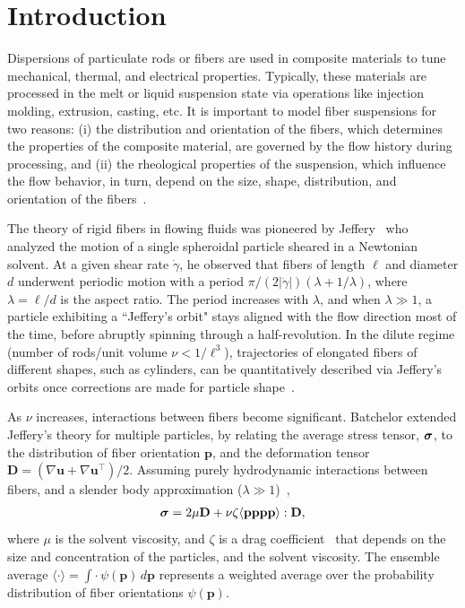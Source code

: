 \documentclass[AMA,STIX1COL]{WileyNJD-v2}
\begin{document}


\section{Introduction}\label{s:intro}
Dispersions of particulate rods or fibers are used in composite
materials to tune mechanical, thermal, and electrical properties.
Typically, these materials are processed in the melt or liquid
suspension state via operations like injection molding, extrusion,
casting, etc. It is important to model fiber suspensions for two
reasons: (i) the distribution and orientation of the fibers, which
determines the properties of the composite material, are governed by the
flow history during processing, and (ii) the rheological properties of
the suspension, which influence the flow behavior, in turn, depend on
the size, shape, distribution, and orientation of the
fibers~\cite{larsoncf}.

The theory of rigid fibers in flowing fluids was pioneered by
Jeffery~\cite{Jeffery1922} who analyzed the motion of a single
spheroidal particle sheared in a Newtonian solvent. At a given shear
rate $\dot{\gamma}$, he observed that fibers of length $\ell$ and
diameter $d$ underwent periodic motion with a period $\pi/(2|\dot{\gamma}|)
(\lambda + 1/\lambda)$, where $\lambda = \ell/d$ is the aspect ratio.
The period increases with $\lambda$, and when $\lambda \gg 1$, a
particle exhibiting a ``Jeffery's orbit" stays aligned with the flow
direction most of the time, before abruptly spinning through a
half-revolution. In the dilute regime (number of rods/unit volume $\nu <
1/\ell^3$), trajectories of elongated fibers of different shapes, such
as cylinders, can be quantitatively described via Jeffery's orbits once
corrections are made for particle shape~\cite{Bretherton1962}.

As $\nu$ increases, interactions between fibers become significant.
Batchelor extended Jeffery's theory for multiple particles, by relating
the average stress tensor, ${\boldsymbol\sigma}$, to the distribution of fiber
orientation $\mathbf{p}$, and the deformation tensor $\mathbf{D} =
(\nabla \mathbf{u} + \nabla \mathbf{u}^\intercal)/2$. Assuming purely
hydrodynamic interactions between fibers, and a slender body
approximation ($\lambda \gg 1$)~\cite{Batchelor1970, Batchelor1970a,
Doi1978, Dinh1984, Shaqfeh1990},
\begin{align}
  {\boldsymbol\sigma} = 2 \mu \mathbf{D} + \nu \zeta 
    \langle \mathbf{p p p p} \rangle : \mathbf{D},
\label{eqn:batchelor}
\end{align}
where $\mu$ is the solvent viscosity, and $\zeta$ is a drag
coefficient~\cite{Batchelor1971} that depends on the size and
concentration of the particles, and the solvent viscosity. The ensemble
average $\langle \cdot \rangle = \int \cdot \,
\psi(\mathbf{p})\,d\mathbf{p}$ represents a weighted average over the
probability distribution of fiber orientations $\psi(\mathbf{p})$. 
\end{document}
